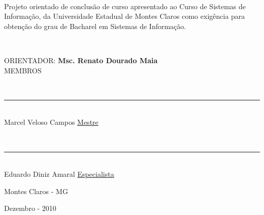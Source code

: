 \documentclass[a4paper,12pt]{report}
\begin{document}
	\ \\[1cm]

\begin{flushright}
	\begin{small}
		\parbox{200pt}{Projeto orientado de conclusão de curso apresentado ao Curso de Sistemas de Informação,	da Universidade Estadual de Montes Claros como exigência para obtenção do grau de Bacharel	em Sistemas de Informação.}
		
	\end{small}
\end{flushright}

\ \\[2cm]

\begin{center}


	ORIENTADOR: \textbf{Msc. Renato Dourado Maia}
	\ \\[2cm]
	MEMBROS

	\ \\[1cm]
	\hrule
	\ \\[0.3cm]
	Marcel Veloso Campos \underline{Mestre}

	\ \\[1cm]
	\hrule
	\ \\[0.3cm]
	Eduardo Diniz Amaral \underline{Especialista}

\end{center}

\begin{center}	
	\vfill
	Montes Claros - MG
	
	Dezembro - 2010 
\end{center}



\def\us{\char`\_}

\thispagestyle{fancy}
\tableofcontents
\thispagestyle{fancy}
\listoffigures
{}
\thispagestyle{fancy}
\listoflistings
{}
\thispagestyle{fancy}
\thispagestyle{fancy}
\printglossaries


\doublespacing






\clearpage
{}


\end{document}
